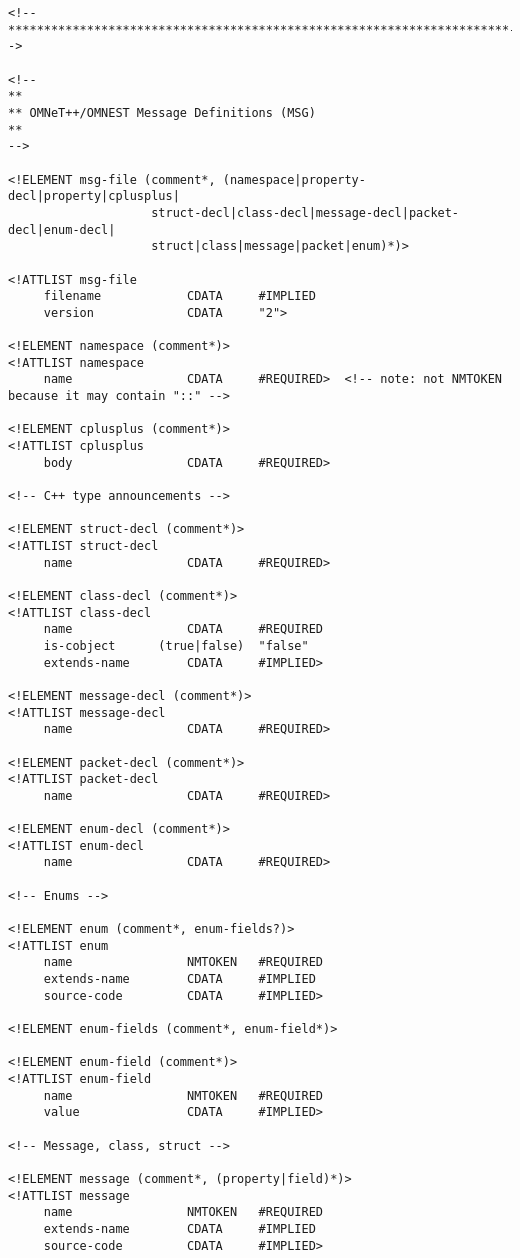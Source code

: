 \begin{verbatim}
<!--**********************************************************************-->

<!--
**
** OMNeT++/OMNEST Message Definitions (MSG)
**
-->

<!ELEMENT msg-file (comment*, (namespace|property-decl|property|cplusplus|
                    struct-decl|class-decl|message-decl|packet-decl|enum-decl|
                    struct|class|message|packet|enum)*)>

<!ATTLIST msg-file
     filename            CDATA     #IMPLIED
     version             CDATA     "2">

<!ELEMENT namespace (comment*)>
<!ATTLIST namespace
     name                CDATA     #REQUIRED>  <!-- note: not NMTOKEN because it may contain "::" -->

<!ELEMENT cplusplus (comment*)>
<!ATTLIST cplusplus
     body                CDATA     #REQUIRED>

<!-- C++ type announcements -->

<!ELEMENT struct-decl (comment*)>
<!ATTLIST struct-decl
     name                CDATA     #REQUIRED>

<!ELEMENT class-decl (comment*)>
<!ATTLIST class-decl
     name                CDATA     #REQUIRED
     is-cobject      (true|false)  "false"
     extends-name        CDATA     #IMPLIED>

<!ELEMENT message-decl (comment*)>
<!ATTLIST message-decl
     name                CDATA     #REQUIRED>

<!ELEMENT packet-decl (comment*)>
<!ATTLIST packet-decl
     name                CDATA     #REQUIRED>

<!ELEMENT enum-decl (comment*)>
<!ATTLIST enum-decl
     name                CDATA     #REQUIRED>

<!-- Enums -->

<!ELEMENT enum (comment*, enum-fields?)>
<!ATTLIST enum
     name                NMTOKEN   #REQUIRED
     extends-name        CDATA     #IMPLIED
     source-code         CDATA     #IMPLIED>

<!ELEMENT enum-fields (comment*, enum-field*)>

<!ELEMENT enum-field (comment*)>
<!ATTLIST enum-field
     name                NMTOKEN   #REQUIRED
     value               CDATA     #IMPLIED>

<!-- Message, class, struct -->

<!ELEMENT message (comment*, (property|field)*)>
<!ATTLIST message
     name                NMTOKEN   #REQUIRED
     extends-name        CDATA     #IMPLIED
     source-code         CDATA     #IMPLIED>


\end{verbatim}
